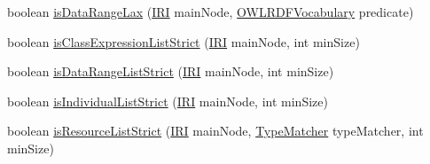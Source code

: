 \begin{DoxyCompactItemize}
\item 
boolean \hyperlink{classorg_1_1coode_1_1owlapi_1_1rdfxml_1_1parser_1_1_abstract_triple_handler_a5d771a7ba9711b2976255cb43ff44938}{is\-Data\-Range\-Lax} (\hyperlink{classorg_1_1semanticweb_1_1owlapi_1_1model_1_1_i_r_i}{I\-R\-I} main\-Node, \hyperlink{enumorg_1_1semanticweb_1_1owlapi_1_1vocab_1_1_o_w_l_r_d_f_vocabulary}{O\-W\-L\-R\-D\-F\-Vocabulary} predicate)
\item 
boolean \hyperlink{classorg_1_1coode_1_1owlapi_1_1rdfxml_1_1parser_1_1_abstract_triple_handler_a44acae035d29a2a8d20f9d93f6a0d244}{is\-Class\-Expression\-List\-Strict} (\hyperlink{classorg_1_1semanticweb_1_1owlapi_1_1model_1_1_i_r_i}{I\-R\-I} main\-Node, int min\-Size)
\item 
boolean \hyperlink{classorg_1_1coode_1_1owlapi_1_1rdfxml_1_1parser_1_1_abstract_triple_handler_a5f9aa0a3cb23fab5d087b9a5d13033f2}{is\-Data\-Range\-List\-Strict} (\hyperlink{classorg_1_1semanticweb_1_1owlapi_1_1model_1_1_i_r_i}{I\-R\-I} main\-Node, int min\-Size)
\item 
boolean \hyperlink{classorg_1_1coode_1_1owlapi_1_1rdfxml_1_1parser_1_1_abstract_triple_handler_a2437a074397056e5f6cc6cabb8b1afb3}{is\-Individual\-List\-Strict} (\hyperlink{classorg_1_1semanticweb_1_1owlapi_1_1model_1_1_i_r_i}{I\-R\-I} main\-Node, int min\-Size)
\item 
boolean \hyperlink{classorg_1_1coode_1_1owlapi_1_1rdfxml_1_1parser_1_1_abstract_triple_handler_ab8c33120f222db21b3a2ef830de46c73}{is\-Resource\-List\-Strict} (\hyperlink{classorg_1_1semanticweb_1_1owlapi_1_1model_1_1_i_r_i}{I\-R\-I} main\-Node, \hyperlink{interfaceorg_1_1coode_1_1owlapi_1_1rdfxml_1_1parser_1_1_abstract_triple_handler_1_1_type_matcher}{Type\-Matcher} type\-Matcher, int min\-Size)
\end{DoxyCompactItemize}
